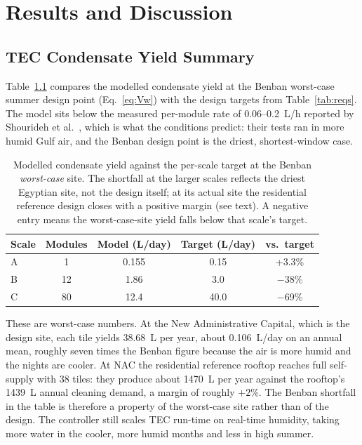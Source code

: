 \documentclass[12pt,a4paper]{report}   %
\begin{document}
\chapter{Results and Discussion}

\section{TEC Condensate Yield Summary}

Table~\ref{tab:yields} compares the modelled condensate yield at the Benban worst-case
summer design point (Eq.~\eqref{eq:Vw}) with the design targets from Table~\ref{tab:reqs}.
The model sits below the measured per-module rate of 0.06--0.2~L/h reported by Shourideh
et al.\ \cite{shourideh2021tec}, which is what the conditions predict: their tests ran in
more humid Gulf air, and the Benban design point is the driest, shortest-window case.

\begin{table}[htbp]
\centering
\caption{Modelled condensate yield against the per-scale target at the Benban \emph{worst-case}
site. The shortfall at the larger scales reflects the driest Egyptian site, not the design itself;
at its actual site the residential reference design closes with a positive margin (see text). A
negative entry means the worst-case-site yield falls below that scale's target.}
\label{tab:yields}
\begin{tabular}{lcccc}
\toprule
\textbf{Scale} & \textbf{Modules} & \textbf{Model (L/day)} & \textbf{Target (L/day)} & \textbf{vs.\ target} \\
\midrule
A & 1 & 0.155 & 0.15 & +3.3\% \\
B & 12 & 1.86 & 3.0 & $-$38\% \\
C & 80 & 12.4 & 40.0 & $-$69\% \\
\bottomrule
\end{tabular}
\end{table}

These are worst-case numbers. At the New Administrative Capital, which is the design site,
each tile yields \SI{38.68}{\liter} per year, about 0.106~L/day on an annual mean, roughly
seven times the Benban figure because the air is more humid and the nights are cooler. At
NAC the residential reference rooftop reaches full self-supply with 38 tiles: they produce about
\SI{1470}{\liter} per year against the rooftop's \SI{1439}{\liter} annual cleaning demand, a
margin of roughly $+2\%$. The Benban shortfall in the table is therefore a property of the
worst-case site rather than of the design. The controller
still scales TEC run-time on real-time humidity, taking more water in the cooler, more
humid months and less in high summer.
\end{document}
